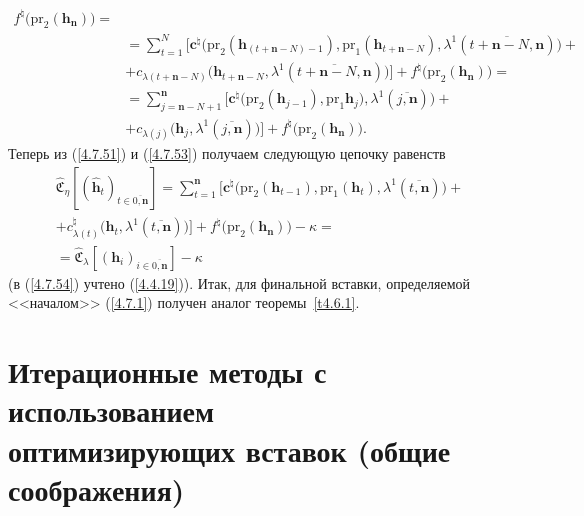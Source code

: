 \documentclass[11pt,twoside]{report}
\newcommand{\ov}{\overline}
\newcommand{\la}{\lambda}
\newcommand{\zc}{{\mathbf c}}
\newcommand{\nn}{{\mathbf n}}
\begin{document}
{{\begin{eqnarray}
f^\natural\bigl(\mathrm{pr}_2(\mathbf{h}_\nn)\bigl)=
&\nonumber\\
&= \sum\limits_{t=1}^N\bigl[\zc^\natural\bigl(\mathrm{pr}_2(\mathbf{h}_{(t+\nn-N)-1}),\mathrm{pr}_1
(\mathbf{h}_{t+\nn-N}),\la^1(\ov{t+\nn-N,\nn})\bigl)+
&\nonumber\\
&+c_{\la(t+\nn-N)}\bigl(\mathbf{h}_{t+\nn-N},\la^1(\ov{t+\nn-N,\nn})\bigl)\bigl]+
f^\natural\bigl(\mathrm{pr}_2(\mathbf{h}_\nn)\bigl)=
&\nonumber\\
&= \sum\limits_{j=\nn-N+1}^\nn\bigl[\zc^\natural\bigl(\mathrm{pr}_2(\mathbf{h}_{j-1}),\mathrm{pr}_1
\mathbf{h}_j),\la^1(\ov{j,\nn})\bigl) +
&\nonumber\\
&+c_{\la(j)}\bigl(\mathbf{h}_j,\la^1(\ov{j,\nn})\bigl)\bigl]+
f^\natural\bigl(\mathrm{pr}_2(\mathbf{h}_\nn)\bigl).
&\label{4.7.53}
\end{eqnarray}
Теперь из (\ref{4.7.51}) и (\ref{4.7.53}) получаем следующую цепочку равенств
\begin{eqnarray}
&\widehat{\mathfrak{C}}_\eta[(\hat{\mathbf{h}}_t)_{t\in\ov{0,\nn}}] =
\sum\limits_{t=1}^\nn\bigl[\zc^\natural\bigl(\mathrm{pr}_2(\mathbf{h}_{t-1}),\mathrm{pr}_1
(\mathbf{h}_t),\la^1(\ov{t,\nn})\bigl) +
&\nonumber\\
&+c_{\la(t)}^\natural\bigl(\mathbf{h}_t,
\la^1(\ov{t,\nn})\bigl)\bigl]+ f^\natural\bigl(\mathrm{pr}_2(\mathbf{h}_\nn)\bigl)- \kappa =
&\nonumber\\
&=\widehat{\mathfrak{C}}_\la[(\mathbf{h}_i)_{i\in\ov{0,\nn}}]-\kappa
&\label{4.7.54}
\end{eqnarray}
(в (\ref{4.7.54}) учтено (\ref{4.4.19})). Итак,   для финальной вставки, определяемой <<началом>>
(\ref{4.7.1}) получен аналог теоремы~\ref{t4.6.1}.

\section{Итерационные методы с использованием\\ оптимизирующих вставок (общие соображения)}
\setcounter{equation}{-1}

}}
\end{document}
